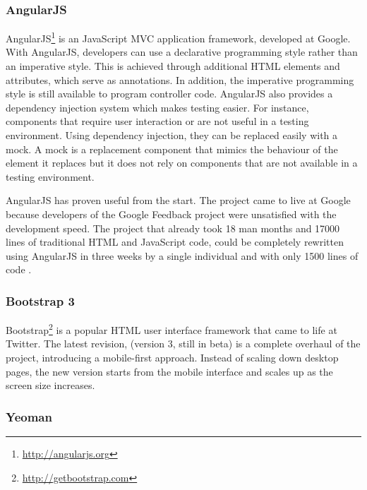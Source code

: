 \subsubsection{AngularJS}

AngularJS\footnote{\url{http://angularjs.org}} is an JavaScript MVC application framework, developed at Google. With AngularJS, developers can use a declarative programming style rather than an imperative style. This is achieved through additional HTML elements and attributes, which serve as annotations. In addition, the imperative programming style is still available to program controller code. AngularJS also provides a dependency injection system which makes testing easier. For instance, components that require user interaction or are not useful in a testing environment. Using dependency injection, they can be replaced easily with a mock. A mock is a replacement component that mimics the behaviour of the element it replaces but it does not rely on components that are not available in a testing environment.

AngularJS has proven useful from the start. The project came to live at Google because developers of the Google Feedback project were unsatisfied with the development speed. The project that already took 18 man months and 17000 lines of traditional HTML and JavaScript code, could be completely rewritten using AngularJS in three weeks by a single individual and with only 1500 lines of code \cite{Green:2013}.

\subsubsection{Bootstrap 3}

Bootstrap\footnote{\url{http://getbootstrap.com}} is a popular HTML user interface framework that came to life at Twitter. The latest revision, (version 3, still in beta) is a complete overhaul of the project, introducing a mobile-first approach. Instead of scaling down desktop pages, the new version starts from the mobile interface and scales up as the screen size increases. 

\subsubsection{Yeoman}

